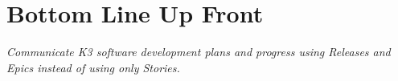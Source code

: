 \documentclass[letterpaper,11pt]{texMemo} %
\begin{document}
\maketitle %


\section*{Bottom Line Up Front}

\emph{Communicate K3 software development plans and progress using \emph{Releases} and \emph{Epics} instead of using only \emph{Stories}.}

\end{document}
